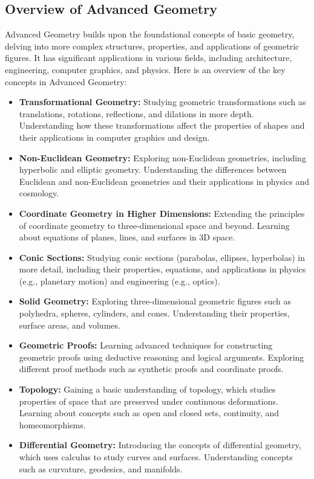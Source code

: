 \documentclass[openany]{book}
\begin{document}
\subsection{Overview of Advanced Geometry}
Advanced Geometry builds upon the foundational concepts of basic geometry, delving into more complex structures, properties, and applications of geometric figures. It has significant applications in various fields, including architecture, engineering, computer graphics, and physics. Here is an overview of the key concepts in Advanced Geometry:
\begin{itemize}
    \item \textbf{Transformational Geometry:} Studying geometric transformations such as translations, rotations, reflections, and dilations in more depth. Understanding how these transformations affect the properties of shapes and their applications in computer graphics and design.
    \item \textbf{Non-Euclidean Geometry:} Exploring non-Euclidean geometries, including hyperbolic and elliptic geometry. Understanding the differences between Euclidean and non-Euclidean geometries and their applications in physics and cosmology.
    \item \textbf{Coordinate Geometry in Higher Dimensions:} Extending the principles of coordinate geometry to three-dimensional space and beyond. Learning about equations of planes, lines, and surfaces in 3D space.
    \item \textbf{Conic Sections:} Studying conic sections (parabolas, ellipses, hyperbolas) in more detail, including their properties, equations, and applications in physics (e.g., planetary motion) and engineering (e.g., optics).
    \item \textbf{Solid Geometry:} Exploring three-dimensional geometric figures such as polyhedra, spheres, cylinders, and cones. Understanding their properties, surface areas, and volumes.
    \item \textbf{Geometric Proofs:} Learning advanced techniques for constructing geometric proofs using deductive reasoning and logical arguments. Exploring different proof methods such as synthetic proofs and coordinate proofs.
    \item \textbf{Topology:} Gaining a basic understanding of topology, which studies properties of space that are preserved under continuous deformations. Learning about concepts such as open and closed sets, continuity, and homeomorphisms.
    \item \textbf{Differential Geometry:} Introducing the concepts of differential geometry, which uses calculus to study curves and surfaces. Understanding concepts such as curvature, geodesics, and manifolds.

\end{itemize}
\end{document}
